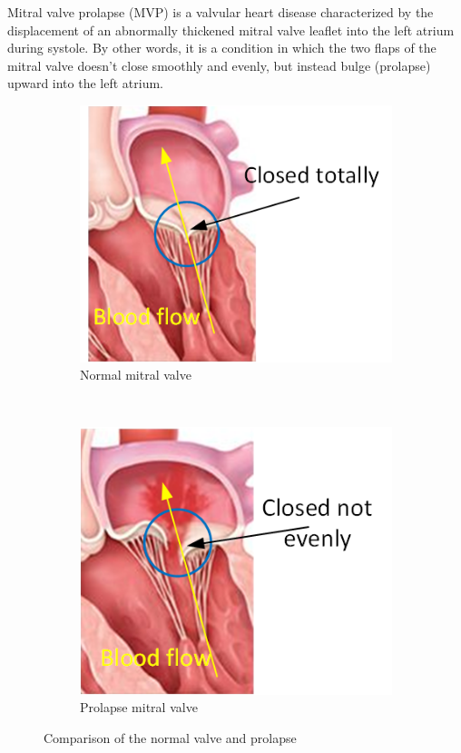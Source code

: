 Mitral valve prolapse (MVP) is a valvular heart disease characterized by the
displacement of an abnormally thickened mitral valve leaflet into the left
atrium during systole. By other words, it is a condition in which the two flaps
of the mitral valve doesn't close smoothly and evenly, but instead bulge
(prolapse) upward into the left atrium.\cite{Hayek2005}
\begin{figure}[H]
  \centering
  \begin{subfigure}[b]{0.4\textwidth}
    \includegraphics[width=\textwidth]{./fig/normalMT.png}
      \caption{Normal mitral valve}
      \label{fig:normalMT}
  \end{subfigure}
  ~
  ~ 
  \begin{subfigure}[b]{0.4\textwidth}
    \includegraphics[width=\textwidth]{./fig/prolapseMT.png}
      \caption{Prolapse mitral valve}
      \label{fig:prolapseMT}
  \end{subfigure}
  \caption{Comparison of the normal valve and prolapse}\label{fig:rodSystem}      
\end{figure} 
